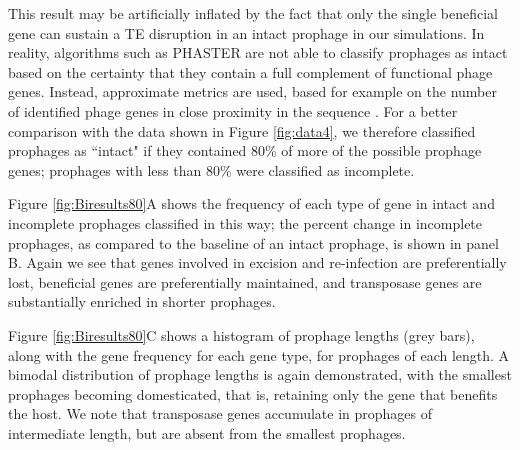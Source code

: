 This result may be artificially inflated by the fact that only the single beneficial gene can sustain a TE disruption in an intact prophage in our simulations.  In reality, algorithms such as PHASTER are not able to classify prophages as intact based on the certainty that they contain a full complement of functional phage genes.  Instead, approximate metrics are used, based for example on the number of identified phage genes in close proximity in the sequence \cite{arndt_phaster:_2016}. For a better comparison with the data shown in Figure \ref{fig:data4}, we therefore classified prophages as ``intact" if they contained 80\% of more of the possible prophage genes; prophages with less than 80\% were classified as incomplete.

Figure \ref{fig:Biresults80}A shows the frequency of each type of gene in intact and incomplete prophages classified in this way; the percent change in incomplete prophages, as compared to the baseline of an intact prophage, is shown in panel B.  Again we see that genes involved in excision and re-infection are preferentially lost, beneficial genes are preferentially maintained, and transposase genes are substantially enriched in shorter prophages.  

Figure \ref{fig:Biresults80}C shows a histogram of prophage lengths (grey bars), along with the gene frequency for each gene type, for prophages of each length.  A bimodal distribution of prophage lengths is again demonstrated, with the smallest prophages becoming domesticated, that is, retaining only the gene that benefits the host.  We note that transposase genes accumulate in prophages of intermediate length, but are absent from the smallest prophages.

